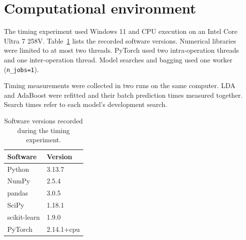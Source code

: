 \section{Computational environment}
\label{app:computational-environment}

The timing experiment used Windows 11 and CPU execution on an Intel Core
Ultra 7 258V. Table~\ref{tab:software-versions} lists the recorded software
versions. Numerical libraries were limited to at most two threads. PyTorch
used two intra-operation threads and one inter-operation thread. Model
searches and bagging used one worker (\texttt{n\_jobs=1}).

Timing measurements were collected in two runs on the same computer.
LDA and AdaBoost were refitted and their batch prediction times measured
together. Search times refer to each model's development search.

\begin{table}[H]
    \centering\small
    \caption[Software versions for timing]{Software versions recorded during
    the timing experiment.}
    \label{tab:software-versions}
    \begin{tabular}{@{}ll@{}}
        \toprule
        Software & Version \\
        \midrule
        Python & 3.13.7 \\
        NumPy & 2.5.4 \\
        pandas & 3.0.5 \\
        SciPy & 1.18.1 \\
        scikit-learn & 1.9.0 \\
        PyTorch & 2.14.1+cpu \\
        \bottomrule
    \end{tabular}
\end{table}
